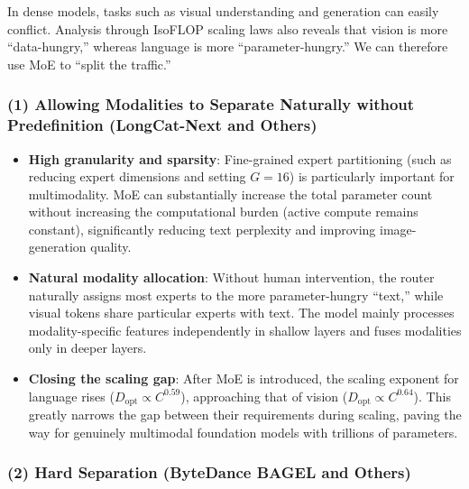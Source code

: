 In dense models, tasks such as visual understanding and generation can easily conflict. Analysis through IsoFLOP scaling laws also reveals that vision is more ``data-hungry,'' whereas language is more ``parameter-hungry.'' We can therefore use MoE to ``split the traffic.''

\hypertarget{allowing-modalities-to-separate-naturally-without-predefinition-longcat-next-and-others}{%
\subsubsection{(1) Allowing Modalities to Separate Naturally without Predefinition (LongCat-Next and Others)}\label{allowing-modalities-to-separate-naturally-without-predefinition-longcat-next-and-others}}

\begin{itemize}
\tightlist
\item
  \textbf{High granularity and sparsity}: Fine-grained expert partitioning (such as reducing expert dimensions and setting \(G=16\)) is particularly important for multimodality. MoE can substantially increase the total parameter count without increasing the computational burden (active compute remains constant), significantly reducing text perplexity and improving image-generation quality.
\item
  \textbf{Natural modality allocation}: Without human intervention, the router naturally assigns most experts to the more parameter-hungry ``text,'' while visual tokens share particular experts with text. The model mainly processes modality-specific features independently in shallow layers and fuses modalities only in deeper layers.
\item
  \textbf{Closing the scaling gap}: After MoE is introduced, the scaling exponent for language rises (\(D_{\mathrm{opt}}\propto C^{0.59}\)), approaching that of vision (\(D_{\mathrm{opt}}\propto C^{0.64}\)). This greatly narrows the gap between their requirements during scaling, paving the way for genuinely multimodal foundation models with trillions of parameters.
\end{itemize}

\hypertarget{hard-separation-bytedance-bagel-and-others}{%
\subsubsection{(2) Hard Separation (ByteDance BAGEL and Others)}\label{hard-separation-bytedance-bagel-and-others}}

